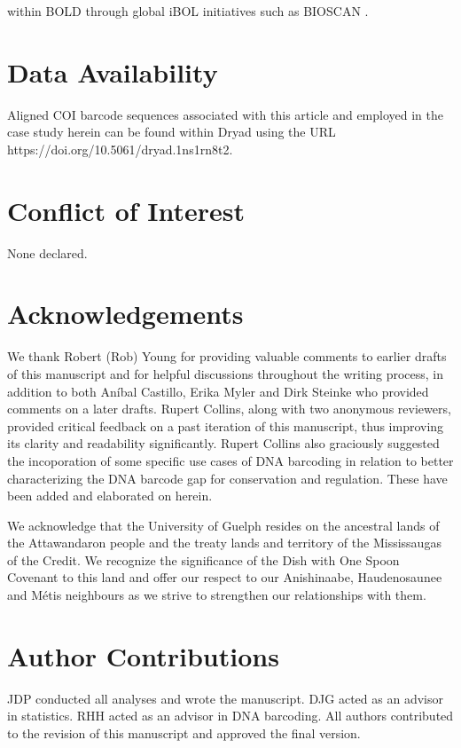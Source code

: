 within BOLD through global iBOL initiatives such as BIOSCAN \cite{hobern2020bioscan, hobern2019bioscan}.  


\newpage

\section*{Data Availability}

Aligned COI barcode sequences associated with this article and employed in the case study herein can be found within Dryad using the URL \\ https://doi.org/10.5061/dryad.1ns1rn8t2.

\section*{Conflict of Interest}

None declared.

\section*{Acknowledgements}

We thank Robert (Rob) Young for providing valuable comments to earlier drafts of this manuscript and for helpful discussions throughout the writing process, in addition to both An{\'i}bal Castillo, Erika Myler and Dirk Steinke who provided comments on a later drafts. Rupert Collins, along with two anonymous reviewers, provided critical feedback on a past iteration of this manuscript, thus improving its clarity and readability significantly. Rupert Collins also graciously suggested the incoporation of some specific use cases of DNA barcoding in relation to better characterizing the DNA barcode gap for conservation and regulation. These have been added and elaborated on herein. 

We acknowledge that the University of Guelph resides on the ancestral lands of the Attawandaron people and the treaty lands and territory of the Mississaugas of the Credit. We recognize the significance of the Dish with One Spoon Covenant to this land and offer our respect to our Anishinaabe, Haudenosaunee and M{\'e}tis neighbours as we strive to strengthen our relationships with them.

\section*{Author Contributions}

JDP conducted all analyses and wrote the manuscript. DJG acted as an advisor in statistics. RHH acted as an advisor in DNA barcoding. All authors contributed to the revision of this manuscript and approved the final version. 



